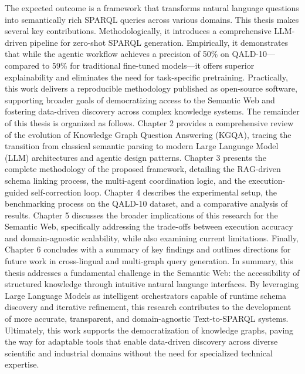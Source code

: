 The expected outcome is a framework that transforms natural language questions into semantically rich SPARQL queries across various domains. This thesis makes several key contributions. Methodologically, it introduces a comprehensive LLM-driven pipeline for zero-shot SPARQL generation. Empirically, it demonstrates that while the agentic workflow achieves a precision of 50\% on QALD-10—compared to 59\% for traditional fine-tuned models—it offers superior explainability and eliminates the need for task-specific pretraining. Practically, this work delivers a reproducible methodology published as open-source software, supporting broader goals of democratizing access to the Semantic Web and fostering data-driven discovery across complex knowledge systems.
The remainder of this thesis is organized as follows. Chapter 2 provides a comprehensive review of the evolution of Knowledge Graph Question Answering (KGQA), tracing the transition from classical semantic parsing to modern Large Language Model (LLM) architectures and agentic design patterns. Chapter 3 presents the complete methodology of the proposed framework, detailing the RAG-driven schema linking process, the multi-agent coordination logic, and the execution-guided self-correction loop. Chapter 4 describes the experimental setup, the benchmarking process on the QALD-10 dataset, and a comparative analysis of results. Chapter 5 discusses the broader implications of this research for the Semantic Web, specifically addressing the trade-offs between execution accuracy and domain-agnostic scalability, while also examining current limitations. Finally, Chapter 6 concludes with a summary of key findings and outlines directions for future work in cross-lingual and multi-graph query generation.
In summary, this thesis addresses a fundamental challenge in the Semantic Web: the accessibility of structured knowledge through intuitive natural language interfaces. By leveraging Large Language Models as intelligent orchestrators capable of runtime schema discovery and iterative refinement, this research contributes to the development of more accurate, transparent, and domain-agnostic Text-to-SPARQL systems. Ultimately, this work supports the democratization of knowledge graphs, paving the way for adaptable tools that enable data-driven discovery across diverse scientific and industrial domains without the need for specialized technical expertise.
